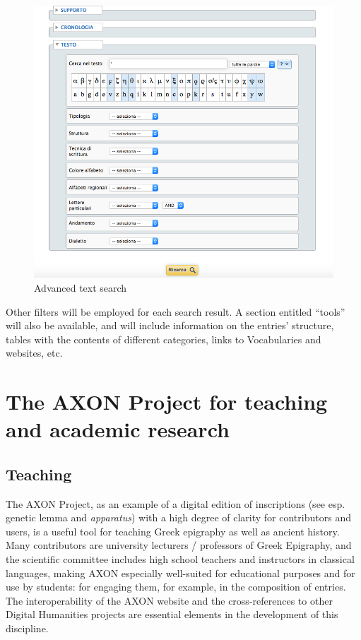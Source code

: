 \documentclass[amsthm,ebook]{saparticle}
\begin{document}
\begin{figure}[!bp]
\centering
 \includegraphics[width=\columnwidth]{EAGLE2016FullPaperrevised-img005.png}
\caption{Advanced text search}
\label{fig:5}
\end{figure}


Other filters will be employed for each search result. A section entitled ``tools'' will also be available, and will
include information on the entries’ structure, tables with the contents of different categories, links to Vocabularies
and websites, etc. 

\section{The AXON Project for teaching and academic research}




\subsection{Teaching}





\noindent The AXON Project, as an example of a digital edition of inscriptions (see esp. genetic lemma and \emph{apparatus}) with a high
degree of clarity for contributors and users, is a useful tool for teaching Greek epigraphy as well as ancient history.
Many contributors are university lecturers / professors of Greek Epigraphy, and the scientific committee includes high
school teachers and instructors in classical languages, making AXON especially well-suited for educational purposes and
for use by students: for engaging them, for example, in the composition of entries. The interoperability of the AXON
website and the cross-references to other Digital Humanities projects are essential elements in the development of this
discipline. 
\end{document}
